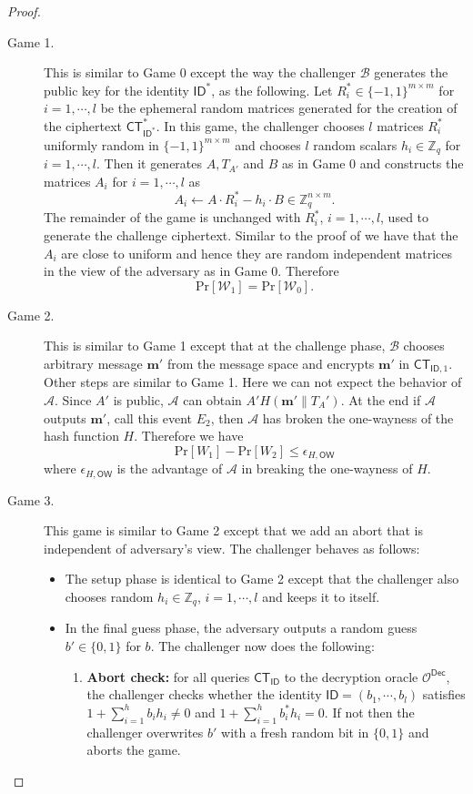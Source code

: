 \documentclass[runningheads]{llncs}
\def\ZZ{\mathbb{Z}}
\def\cal{\mathcal}
\def\bf{\mathbf}
\def\CT{\mathsf{CT}}
\def\Dec{\mathsf{Dec}}
\def\Pr{\mathrm{Pr}}
\def\ID{\mathsf{ID}}
\def\W{\cal{W}}
\begin{document}
\begin{proof}
\begin{description}
\item[Game 1.] This is similar to Game 0 except the way the challenger $\cal{B}$ generates the public key for the identity $\ID^*$, as the following. Let $R^*_i\in\{-1,1\}^{m\times m}$ for $i=1,\cdots,l$ be the ephemeral random matrices generated for the creation of the ciphertext $\CT_{\ID^*}^*$. In this game, the challenger chooses $l$ matrices $R_i^*$ uniformly random in $\{-1,1\}^{m\times m}$ and chooses $l$ random scalars $h_i\in\ZZ_q$ for $i=1,\cdots,l$. Then it generates $A,T_{A'}$ and $B$ as in Game 0 and constructs the matrices $A_i$ for $i=1,\cdots,l$ as
$$A_i\gets A\cdot R^*_i-h_i\cdot B\in\ZZ_q^{n\times m}.$$
The remainder of the game is unchanged with $R_i^*$, $i=1,\cdots, l$, used to generate the challenge ciphertext. Similar to the proof of {\cite[Theorem 25]{ABB10-EuroCrypt}} we have that the $A_i$ are close to uniform and hence they are random independent matrices in the view of the adversary as in Game 0. Therefore
$$\Pr[\W_1] =\Pr[\W_0].$$
\item[Game 2.] This is similar to Game 1 except that at the challenge phase, $\cal{B}$ chooses arbitrary message $\bf{m}'$ from the message space and  encrypts $\bf{m}'$ in $\CT_{\ID,1}$. Other steps are similar to Game 1. Here we can not expect the behavior of $\cal{A}$. Since $A'$ is public, $\cal{A}$ can obtain $A'H(\bf{m}'\|T_A')$. At the end if $\cal{A}$ outputs $\bf{m}'$, call this event $E_2$, then $\cal{A}$ has broken the one-wayness of the hash function $H$. Therefore we have
$$\Pr[W_1]-\Pr[W_2]\leq\epsilon_{H,\mathsf{OW}}$$
where $\epsilon_{H,\mathsf{OW}}$ is the advantage of $\cal{A}$ in breaking the one-wayness of $H$.
\item[Game 3.] This game is similar to Game 2 except that we add an abort that is independent of adversary's view. The challenger behaves as follows:
\begin{itemize}
\item The setup phase is identical to Game 2 except that the challenger also chooses random $h_i\in\ZZ_q$, $i=1,\cdots, l$ and keeps it to itself.
\item In the final guess phase, the adversary outputs a random guess $b'\in\{0,1\}$ for $b$. The challenger now does the following:
\begin{enumerate}
\item \textbf{Abort check:} for all queries $\CT_\ID$ to the decryption oracle $\cal{O}^\Dec$, the challenger checks whether the identity $\ID=(b_1,\cdots,b_l)$ satisfies $1+\sum_{i=1}^hb_ih_i\ne 0$ and $1+\sum_{i=1}^hb^*_ih_i= 0$. If not then the challenger overwrites $b'$ with a fresh random bit in $\{0,1\}$ and aborts the game.

\end{enumerate}
\end{itemize}
\end{description}
\end{proof}
\end{document}
